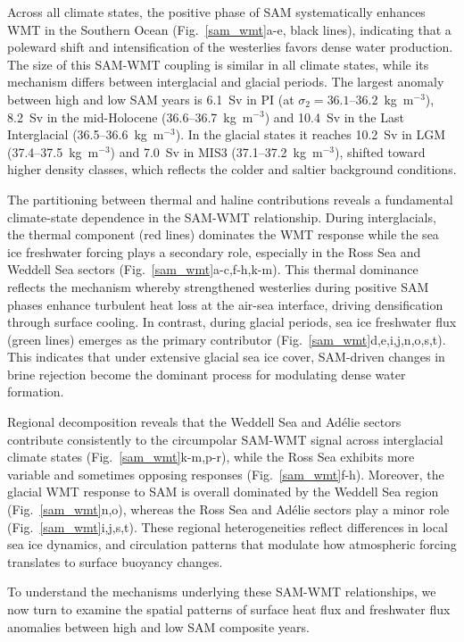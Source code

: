 \documentclass[pdflatex,sn-nature]{sn-jnl}
\begin{document}
Across all climate states, the positive phase of SAM systematically enhances WMT in the Southern Ocean (Fig.~\ref{sam_wmt}a-e, black lines), indicating that a poleward shift and intensification of the westerlies favors dense water production. The size of this SAM-WMT coupling is similar in all climate states, while its mechanism differs between interglacial and glacial periods. The largest anomaly between high and low SAM years is 6.1~Sv in PI (at $\sigma_2 = 36.1$--$36.2$~kg~m$^{-3}$), 8.2~Sv in the mid-Holocene (36.6--36.7~kg~m$^{-3}$) and 10.4~Sv in the Last Interglacial (36.5--36.6~kg~m$^{-3}$). In the glacial states it reaches 10.2~Sv in LGM (37.4--37.5~kg~m$^{-3}$) and 7.0~Sv in MIS3 (37.1--37.2~kg~m$^{-3}$), shifted toward higher density classes, which reflects the colder and saltier background conditions.


The partitioning between thermal and haline contributions reveals a fundamental  climate-state dependence in the SAM-WMT relationship. During interglacials, the thermal component (red lines) dominates the WMT response while the sea ice freshwater forcing plays a secondary role, especially in the Ross Sea and Weddell Sea sectors (Fig.~\ref{sam_wmt}a-c,f-h,k-m). This thermal dominance reflects the mechanism whereby strengthened westerlies during positive SAM phases enhance turbulent heat loss at the air-sea interface, driving densification through surface cooling. In contrast, during glacial periods, sea ice freshwater flux (green lines) emerges as the primary contributor (Fig.~\ref{sam_wmt}d,e,i,j,n,o,s,t). This indicates that under extensive glacial sea ice cover, SAM-driven changes in brine rejection become the dominant process for modulating dense water formation.

Regional decomposition reveals that the Weddell Sea and Ad\'elie sectors contribute consistently to the circumpolar SAM-WMT signal across interglacial climate states (Fig.~\ref{sam_wmt}k-m,p-r), while the Ross Sea exhibits more variable and sometimes opposing responses (Fig.~\ref{sam_wmt}f-h). Moreover, the glacial WMT response to SAM is overall dominated by the Weddell Sea region (Fig.~\ref{sam_wmt}n,o), whereas the Ross Sea and Ad\'elie sectors play a minor role (Fig.~\ref{sam_wmt}i,j,s,t). These regional  heterogeneities reflect differences in local sea ice dynamics, and circulation patterns that modulate how atmospheric forcing translates to surface
  buoyancy changes.


To understand the mechanisms underlying these SAM-WMT relationships, we now turn to examine the spatial patterns of surface heat flux and freshwater flux anomalies between high and low SAM composite years.
\end{document}
